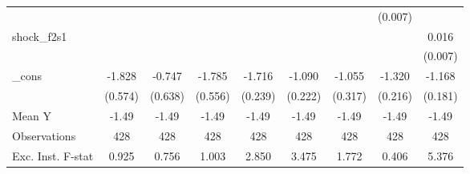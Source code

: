 {\begin{tabular}{l*{8}{c}}
            &                     &                     &                     &                     &                     &                     &     (0.007)         &                     \\
\addlinespace
shock\_f2s1  &                     &                     &                     &                     &                     &                     &                     &       0.016\sym{**} \\
            &                     &                     &                     &                     &                     &                     &                     &     (0.007)         \\
\addlinespace
\_cons      &      -1.828\sym{***}&      -0.747         &      -1.785\sym{***}&      -1.716\sym{***}&      -1.090\sym{***}&      -1.055\sym{***}&      -1.320\sym{***}&      -1.168\sym{***}\\
            &     (0.574)         &     (0.638)         &     (0.556)         &     (0.239)         &     (0.222)         &     (0.317)         &     (0.216)         &     (0.181)         \\
\midrule
Mean Y      &       -1.49         &       -1.49         &       -1.49         &       -1.49         &       -1.49         &       -1.49         &       -1.49         &       -1.49         \\
Observations&         428         &         428         &         428         &         428         &         428         &         428         &         428         &         428         \\
Exc. Inst. F-stat&       0.925         &       0.756         &       1.003         &       2.850         &       3.475         &       1.772         &       0.406         &       5.376         \\
\bottomrule
\end{tabular}
}
